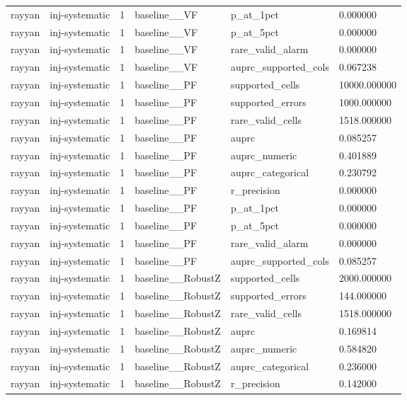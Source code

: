 \begin{tabular}{llllll}
rayyan & inj-systematic & 1 & baseline\_\_VF & p\_at\_1pct & 0.000000 \\
rayyan & inj-systematic & 1 & baseline\_\_VF & p\_at\_5pct & 0.000000 \\
rayyan & inj-systematic & 1 & baseline\_\_VF & rare\_valid\_alarm & 0.000000 \\
rayyan & inj-systematic & 1 & baseline\_\_VF & auprc\_supported\_cols & 0.067238 \\
rayyan & inj-systematic & 1 & baseline\_\_PF & supported\_cells & 10000.000000 \\
rayyan & inj-systematic & 1 & baseline\_\_PF & supported\_errors & 1000.000000 \\
rayyan & inj-systematic & 1 & baseline\_\_PF & rare\_valid\_cells & 1518.000000 \\
rayyan & inj-systematic & 1 & baseline\_\_PF & auprc & 0.085257 \\
rayyan & inj-systematic & 1 & baseline\_\_PF & auprc\_numeric & 0.401889 \\
rayyan & inj-systematic & 1 & baseline\_\_PF & auprc\_categorical & 0.230792 \\
rayyan & inj-systematic & 1 & baseline\_\_PF & r\_precision & 0.000000 \\
rayyan & inj-systematic & 1 & baseline\_\_PF & p\_at\_1pct & 0.000000 \\
rayyan & inj-systematic & 1 & baseline\_\_PF & p\_at\_5pct & 0.000000 \\
rayyan & inj-systematic & 1 & baseline\_\_PF & rare\_valid\_alarm & 0.000000 \\
rayyan & inj-systematic & 1 & baseline\_\_PF & auprc\_supported\_cols & 0.085257 \\
rayyan & inj-systematic & 1 & baseline\_\_RobustZ & supported\_cells & 2000.000000 \\
rayyan & inj-systematic & 1 & baseline\_\_RobustZ & supported\_errors & 144.000000 \\
rayyan & inj-systematic & 1 & baseline\_\_RobustZ & rare\_valid\_cells & 1518.000000 \\
rayyan & inj-systematic & 1 & baseline\_\_RobustZ & auprc & 0.169814 \\
rayyan & inj-systematic & 1 & baseline\_\_RobustZ & auprc\_numeric & 0.584820 \\
rayyan & inj-systematic & 1 & baseline\_\_RobustZ & auprc\_categorical & 0.236000 \\
rayyan & inj-systematic & 1 & baseline\_\_RobustZ & r\_precision & 0.142000 \\

\end{tabular}
